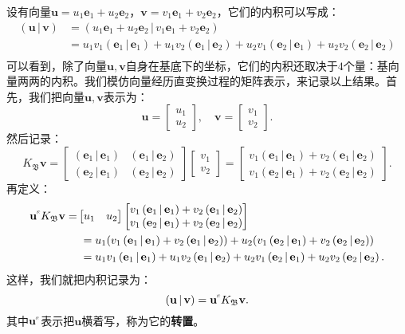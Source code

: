 \documentclass[12pt,UTF8]{ctexbook}
\newcommand{\nji}[2]{\displaystyle\left( #1 \,|\, #2\right)}
\newcommand{\tr}{%
    \mathord{
        \begin{tikzpicture}[baseline=-0.2em, line width=0.3pt]
        \draw (-0.15em, 0.15em) -- (0.06em, -0.06em);
        \draw (45:0.15em) arc[start angle=45, end angle=225, radius=0.15em];
    \end{tikzpicture}
    }
}
\theoremstyle{definition}
\theoremstyle{plain}
\begin{document}
设有向量$\mathbf{u} = u_1\mathbf{e}_1 + u_2\mathbf{e}_2$，$\mathbf{v} = v_1\mathbf{e}_1 + v_2\mathbf{e}_2$，它们的内积可以写成：
\begin{align*}
    \nji{\mathbf{u}}{\mathbf{v}} &= \nji{u_1\mathbf{e}_1 + u_2\mathbf{e}_2}{v_1\mathbf{e}_1 + v_2\mathbf{e}_2} \\
    &= u_1v_1 \nji{\mathbf{e}_1}{\mathbf{e}_1} + u_1v_2 \nji{\mathbf{e}_1}{\mathbf{e}_2} + u_2v_1 \nji{\mathbf{e}_2}{\mathbf{e}_1} + u_2v_2 \nji{\mathbf{e}_2}{\mathbf{e}_2} \\
\end{align*}
可以看到，除了向量$\mathbf{u}, \mathbf{v}$自身在基底下的坐标，它们的内积还取决于$4$个量：基向量两两的内积。我们模仿向量经历直变换过程的矩阵表示，来记录以上结果。首先，我们把向量$\mathbf{u}, \mathbf{v}$表示为：
$$ \mathbf{u} = \begin{bmatrix}
    u_1\\ u_2
\end{bmatrix},\quad \mathbf{v} = \begin{bmatrix}
    v_1\\ v_2
\end{bmatrix}. $$
然后记录：
$$ K_{\mathfrak{B}} \mathbf{v} = \begin{bmatrix}
     \nji{\mathbf{e}_1}{\mathbf{e}_1} & \nji{\mathbf{e}_1}{\mathbf{e}_2} \\ \nji{\mathbf{e}_2}{\mathbf{e}_1} & \nji{\mathbf{e}_2}{\mathbf{e}_2}
\end{bmatrix}\begin{bmatrix}
    v_1\\ v_2
\end{bmatrix} = \begin{bmatrix}
    v_1\nji{\mathbf{e}_1}{\mathbf{e}_1} + v_2\nji{\mathbf{e}_1}{\mathbf{e}_2}\\ v_1\nji{\mathbf{e}_2}{\mathbf{e}_1} + v_2\nji{\mathbf{e}_2}{\mathbf{e}_2}
\end{bmatrix}.$$
再定义：
\begin{align*}
    \mathbf{u}^{\tr} K_{\mathfrak{B}} \mathbf{v} =& \begin{bmatrix}
        u_1 & u_2
    \end{bmatrix}\begin{bmatrix}
        v_1\nji{\mathbf{e}_1}{\mathbf{e}_1} + v_2\nji{\mathbf{e}_1}{\mathbf{e}_2}\\ v_1\nji{\mathbf{e}_2}{\mathbf{e}_1} + v_2\nji{\mathbf{e}_2}{\mathbf{e}_2}
    \end{bmatrix} \\
    &\;= u_1 (v_1\nji{\mathbf{e}_1}{\mathbf{e}_1} + v_2\nji{\mathbf{e}_1}{\mathbf{e}_2}) + u_2 (v_1\nji{\mathbf{e}_2}{\mathbf{e}_1} + v_2\nji{\mathbf{e}_2}{\mathbf{e}_2}) \\
    &\;= u_1v_1 \nji{\mathbf{e}_1}{\mathbf{e}_1} + u_1v_2\nji{\mathbf{e}_1}{\mathbf{e}_2} + u_2v_1\nji{\mathbf{e}_2}{\mathbf{e}_1} + u_2v_2\nji{\mathbf{e}_2}{\mathbf{e}_2}.
\end{align*}
这样，我们就把内积记录为：
$$ \nji{\mathbf{u}}{\mathbf{v}} = \mathbf{u}^{\tr} K_{\mathfrak{B}} \mathbf{v}. $$
其中$\mathbf{u}^{\tr}$表示把$\mathbf{u}$横着写，称为它的\textbf{转置}。
\end{document}
